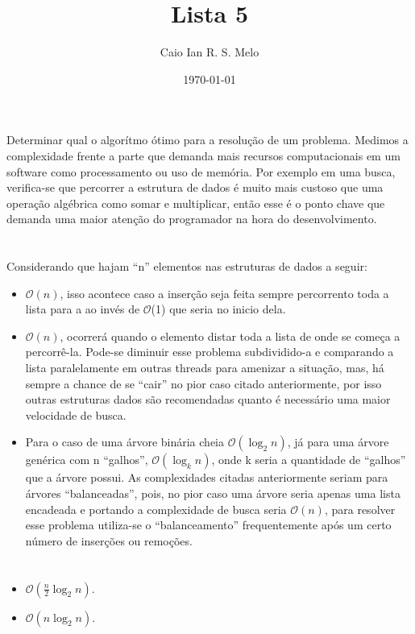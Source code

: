\documentclass{article}
\title{Lista 5}
\author{Caio Ian R. S. Melo}
\date{\today}
\begin{document}
\maketitle

\section{}
Determinar qual o algorítmo ótimo para a resolução de um problema. Medimos a complexidade frente a parte que demanda mais recursos computacionais em um software como processamento ou uso de memória. Por exemplo em uma busca, verifica-se que percorrer a estrutura de dados é muito mais custoso que uma operação algébrica como somar e multiplicar, então esse é o ponto chave que demanda uma maior atenção do programador na hora do desenvolvimento.

\section{}

Considerando que hajam ``n'' elementos nas estruturas de dados a seguir:

\begin{itemize}
\item $\mathcal{O}(n)$, isso acontece caso a inserção seja feita sempre percorrento toda a lista para a ao invés de $\mathcal{O}$(1) que seria no inicio dela.
\item $\mathcal{O}(n)$, ocorrerá quando o elemento distar toda a lista de onde se começa a percorrê-la. Pode-se diminuir esse problema subdividido-a e comparando a lista paralelamente em outras threads para amenizar a situação, mas, há sempre a chance de se ``cair'' no pior caso citado anteriormente, por isso outras estruturas dados são recomendadas quanto é necessário uma maior velocidade de busca.
\item  Para o caso de uma árvore binária cheia $\mathcal{O}(\log_{2}n)$, já para uma árvore genérica com n ``galhos'', $\mathcal{O}(\log_{k}n)$, onde k seria a quantidade de ``galhos'' que a árvore possui. As complexidades citadas anteriormente seriam para árvores ``balanceadas'', pois, no pior caso uma árvore seria apenas uma lista encadeada e portando a complexidade de busca seria $\mathcal{O}(n)$, para resolver esse problema utiliza-se o ``balanceamento'' frequentemente após um certo número de inserções ou remoções.
\end{itemize}

\pagebreak
\section{}

\begin{itemize}
\item $\mathcal{O}(\frac{n}{2}\log_{2}n)$.
\item $\mathcal{O}(n\log_{2}n)$.
\end{itemize}
\end{document}
